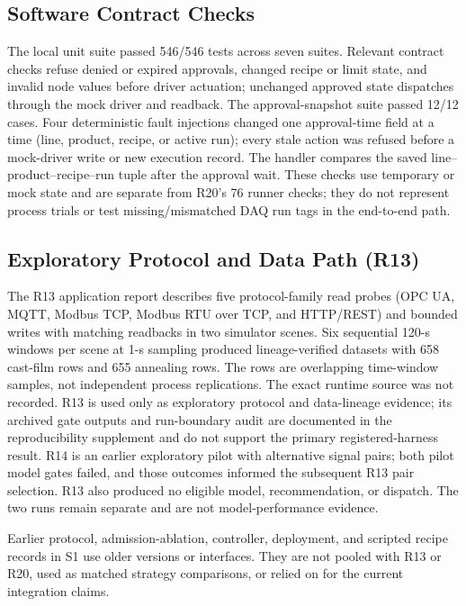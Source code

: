 \subsection{Software Contract Checks}
The local unit suite passed 546/546 tests across seven suites. Relevant
contract checks refuse denied or expired approvals, changed recipe or limit
state, and invalid node values before driver actuation; unchanged approved
state dispatches through the mock driver and readback. The approval-snapshot
suite passed 12/12 cases. Four deterministic fault injections changed one
approval-time field at a time (line, product, recipe, or active run); every
stale action was refused before a mock-driver write or new execution record.
The handler compares the saved line--product--recipe--run tuple after the
approval wait. These checks use temporary or mock state and are separate from
R20's 76 runner checks; they do not represent process trials or test
missing/mismatched DAQ run tags in the end-to-end path.

\subsection{Exploratory Protocol and Data Path (R13)}
\label{sec:crossscene}
The R13 application report describes five protocol-family read probes (OPC UA,
MQTT, Modbus TCP, Modbus RTU over TCP, and HTTP/REST) and bounded writes with
matching readbacks in two simulator scenes. Six sequential 120-s windows per
scene at 1-s sampling produced lineage-verified datasets with 658 cast-film
rows and 655 annealing rows. The rows are overlapping time-window samples, not
independent process replications. The exact runtime source was not recorded. R13 is
used only as exploratory protocol and data-lineage evidence; its archived gate
outputs and run-boundary audit are documented in the reproducibility
supplement and do not support the primary registered-harness result.
R14 is an earlier exploratory pilot with alternative signal pairs; both pilot
model gates failed, and those outcomes informed the subsequent R13 pair
selection. R13 also produced no eligible model, recommendation, or dispatch.
The two runs remain separate and are not model-performance evidence.

Earlier protocol, admission-ablation, controller, deployment, and scripted
recipe records in S1 use older versions or interfaces. They are not pooled
with R13 or R20, used as matched strategy comparisons, or relied on for the
current integration claims.
